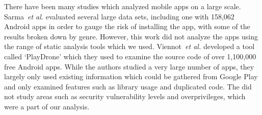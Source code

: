 \documentclass{sig-alternate}
\begin{document}

There have been many studies which analyzed mobile apps on a large scale. Sarma~\emph{et al.} evaluated several large data sets, including one with 158,062 Android apps in order to gauge the risk of installing the app, with some of the results broken down by genre. However, this work did not analyze the apps using the range of static analysis tools which we used. Viennot~\emph{et al.} developed a tool called `PlayDrone' which they used to examine the source code of over 1,100,000 free Android apps. While the authors studied a very large number of apps, they largely only used existing information which could be gathered from Google Play and only examined features such as library usage and duplicated code. The did not study areas such as security vulnerability levels and overprivileges, which were a part of our analysis.




\end{document}
